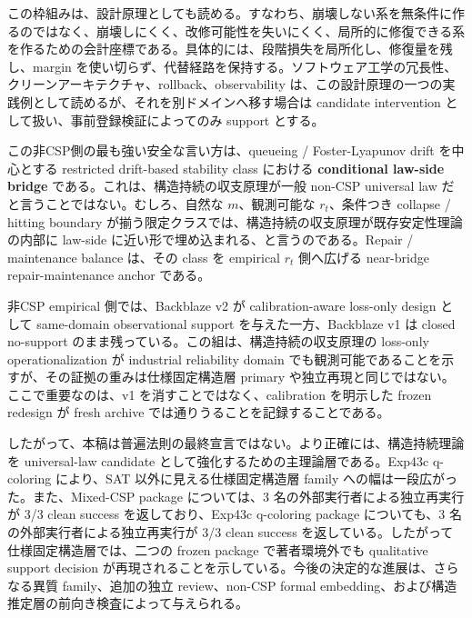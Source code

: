 \documentclass[12pt,a4paper]{article}
\begin{document}
この枠組みは、設計原理としても読める。すなわち、崩壊しない系を無条件に作るのではなく、崩壊しにくく、改修可能性を失いにくく、局所的に修復できる系を作るための会計座標である。具体的には、段階損失を局所化し、修復量を残し、margin を使い切らず、代替経路を保持する。ソフトウェア工学の冗長性、クリーンアーキテクチャ、rollback、observability は、この設計原理の一つの実践例として読めるが、それを別ドメインへ移す場合は candidate intervention として扱い、事前登録検証によってのみ support とする。

この非CSP側の最も強い安全な言い方は、queueing / Foster-Lyapunov drift を中心とする restricted drift-based stability class における \textbf{conditional law-side bridge} である。これは、構造持続の収支原理が一般 non-CSP universal law だと言うことではない。むしろ、自然な \(m\)、観測可能な \(r_{t}\)、条件つき collapse / hitting boundary が揃う限定クラスでは、構造持続の収支原理が既存安定性理論の内部に law-side に近い形で埋め込まれる、と言うのである。Repair / maintenance balance は、その class を empirical \(r_{t}\) 側へ広げる near-bridge repair-maintenance anchor である。

非CSP empirical 側では、Backblaze v2 が calibration-aware loss-only design として same-domain observational support を与えた一方、Backblaze v1 は closed no-support のまま残っている。この組は、構造持続の収支原理の loss-only operationalization が industrial reliability domain でも観測可能であることを示すが、その証拠の重みは仕様固定構造層 primary や独立再現と同じではない。ここで重要なのは、v1 を消すことではなく、calibration を明示した frozen redesign が fresh archive では通りうることを記録することである。

したがって、本稿は普遍法則の最終宣言ではない。より正確には、構造持続理論を universal-law candidate として強化するための主理論層である。Exp43c q-coloring により、SAT 以外に見える仕様固定構造層 family への幅は一段広がった。また、Mixed-CSP package については、3 名の外部実行者による独立再実行が 3/3 clean success を返しており、Exp43c q-coloring package についても、3 名の外部実行者による独立再実行が 3/3 clean success を返している。したがって仕様固定構造層では、二つの frozen package で著者環境外でも qualitative support decision が再現されることを示している。今後の決定的な進展は、さらなる異質 family、追加の独立 review、non-CSP formal embedding、および構造推定層の前向き検査によって与えられる。
\end{document}
